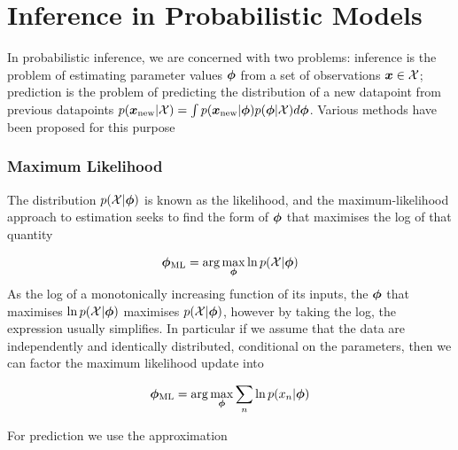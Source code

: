 

\newcommand \qfam { { \mathcal{Q} } }
\newcommand \xdat { { \mathcal{X} } }
\newcommand \zdat { { \mathcal{Z} } }
\newcommand \xnew { { \vv{x}_{\text{new}} } }
\newcommand \znew { { \vv{z}_{\text{new}} } }
\newcommand \param { { \vv{\phi} } }
\newcommand \ml[1] { { {#1}_{\text{ML}} } } 
\newcommand \map[1] { { {#1}_{\text{MAP}} } } 
\newcommand \quarter { { \oneover{4} } }
\newcommand \eighth { { \oneover{8} } }
\newcommand \fqt[1] { { \mathcal{F}\left( {#1} \right) } }
\newcommand \joint { { p(\xdat, \zdat | \param) } }
\newcommand \logjoint { { \ln \joint } }
\newcommand \exlogjoint[1] { { \ex{\logjoint}{{#1}} } }

\section{Inference in Probabilistic Models}
In probabilistic inference, we are concerned with two problems: inference is the problem of estimating parameter values $\param$ from a set of observations $\vv{x} \in \xdat$; prediction is the problem of predicting the distribution of a new datapoint from previous datapoints $p(\xnew | \xdat) = \int p(\xnew | \param) p(\param | \xdat) d\param$. Various methods have been proposed for this purpose

\subsubsection*{Maximum Likelihood}
The distribution $p(\xdat|\param)$ is known as the likelihood, and the maximum-likelihood approach to estimation seeks to find the form of $\param$ that maximises the log of that quantity

\begin{align*}
\ml{\param} = \arg \max_{\param} \ln p(\xdat | \param)
\end{align*}
As the log of a monotonically increasing function of its inputs, the $\param$ that maximises $\ln p(\xdat | \param)$ maximises $p(\xdat | \param)$, however by taking the log, the expression usually simplifies. In particular if we assume that the data are independently and identically distributed, conditional on the parameters, then we can factor the maximum likelihood update into

\begin{align*}
\ml{\param} = \arg \max_{\param} \sum_n \ln p(x_n | \param)
\end{align*}

For prediction we use the approximation

